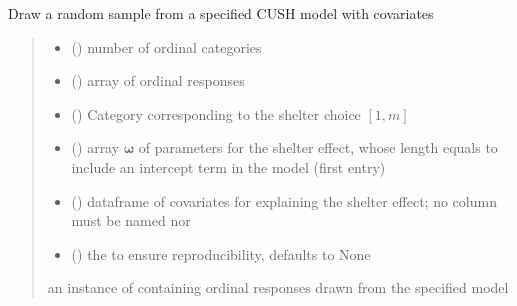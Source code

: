 \documentclass[letterpaper,10pt,english]{sphinxmanual}
\begin{document}
\begin{fulllineitems}
\label{\detokenize{cubmods:cubmods.cush_x.draw}}
\pysigstartsignatures
{}
\pysigstopsignatures
\sphinxAtStartPar
Draw a random sample from a specified CUSH model with covariates
\begin{quote}\begin{description}
\begin{itemize}
\item {} 
\sphinxAtStartPar
{} () \textendash{} number of ordinal categories

\item {} 
\sphinxAtStartPar
{} () \textendash{} array of ordinal responses

\item {} 
\sphinxAtStartPar
{} () \textendash{} Category corresponding to the shelter choice \([1,m]\)

\item {} 
\sphinxAtStartPar
{} () \textendash{} array \(\pmb \omega\) of parameters for the shelter effect, whose length equals 
 to include an intercept term in the model (first entry)

\item {} 
\sphinxAtStartPar
{} () \textendash{} dataframe of covariates for explaining the shelter effect;
no column must be named  nor 

\item {} 
\sphinxAtStartPar
{} (\sphinxstyleliteralemphasis{\sphinxupquote{, }}) \textendash{} the  to ensure reproducibility, defaults to None

\end{itemize}

\sphinxAtStartPar
an instance of  containing ordinal responses drawn from the specified model

\end{description}\end{quote}

\end{fulllineitems}
\end{document}
